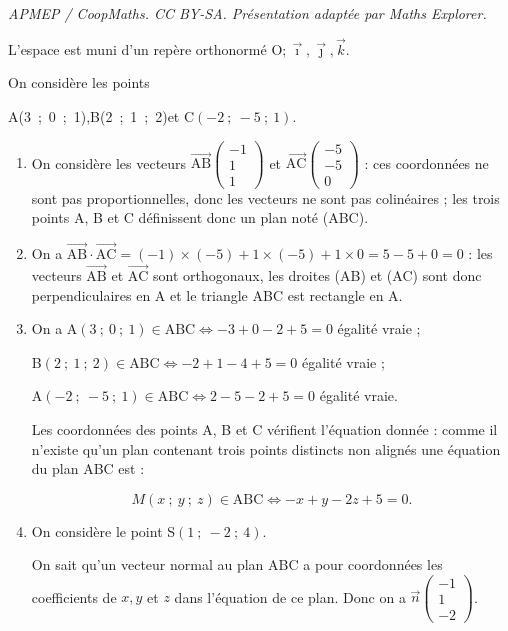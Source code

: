 \documentclass[10pt]{article}
\providecommand{\vect}[1]{\overrightarrow{#1}}
\providecommand{\Oijk}{\(\mathrm{O};\vec{\imath},\vec{\jmath},\vec{k}\)}
\begin{document}
\noindent\textit{APMEP / CoopMaths. CC BY-SA. Présentation adaptée par Maths Explorer.}\par\medskip
\medskip

L'espace est muni d'un repère orthonormé \Oijk.

On considère les points 
\begin{center}A(3~;~0~;~1),\qquad  B(2~;~1~;~2)\quad  et \quad C$(- 2~;~- 5~;~1)$.\end{center}

\smallskip

\begin{enumerate}
\item 
On considère les vecteurs $\vect{\text{AB}}\begin{pmatrix}-1\\1\\1\end{pmatrix}$ et $\vect{\text{AC}}\begin{pmatrix}-5\\-5\\0\end{pmatrix}$ : ces coordonnées ne sont pas proportionnelles, donc les vecteurs ne sont pas colinéaires ; les trois points A, B et C définissent donc un plan noté (ABC).
\item 
On a $\vect{\text{AB}} \cdot \vect{\text{AC}} = (- 1) \times (- 5) + 1 \times (- 5) + 1 \times 0 = 5 - 5 + 0 = 0$ : les vecteurs $\vect{\text{AB}}$ et $\vect{\text{AC}}$ sont orthogonaux, les droites (AB) et (AC) sont donc perpendiculaires en A et le triangle ABC est rectangle en A.
\item 

On a A$(3~;~0~;~1) \in \text{ABC} \iff - 3  + 0 - 2 + 5 = 0$ égalité vraie ;

B$(2~;~1~;~2) \in \text{ABC} \iff - 2  + 1 - 4 + 5 = 0$ égalité vraie ;

A$(- 2~;~- 5~;~1) \in \text{ABC} \iff 2  - 5 - 2 + 5 = 0$ égalité vraie.

Les coordonnées des points A, B et C vérifient l'équation donnée : comme il n'existe qu'un plan contenant trois points distincts non alignés une équation du plan ABC est :

\[M(x~;~y~;~z) \in \text{ABC} \iff -x + y - 2z + 5 = 0.\]

\item On considère le point S$(1~;~-2~;~4)$.




On sait qu'un vecteur normal au plan ABC a pour coordonnées les coefficients de $x, y$ et $z$ dans l'équation de ce plan. Donc on a $\vect{n}\begin{pmatrix}-1\\1\\-2\end{pmatrix}$.


\end{enumerate}
\end{document}
